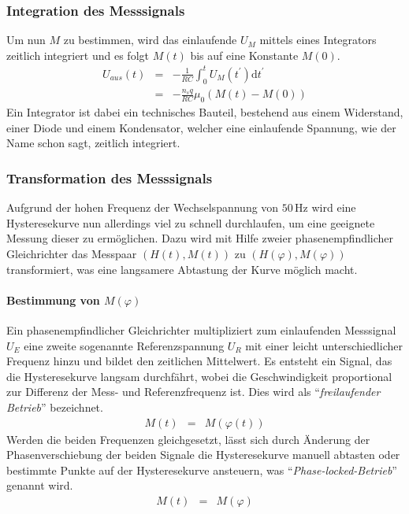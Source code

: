 \documentclass[12pt,a4paper]{scrartcl}
\numberwithin{equation}{section} %
\renewcommand{\[}{} %
\renewcommand{\]}{\noindent} %
\begin{document}
\hypertarget{integration-des-messsignals}{%
\subsubsection{Integration des
Messsignals}\label{integration-des-messsignals}}

Um nun \(M\) zu bestimmen, wird das einlaufende \(U_M\) mittels eines
Integrators zeitlich integriert und es folgt \(M(t)\) bis auf eine
Konstante \(M(0)\). \[
\begin{eqnarray}
    U_{aus}(t)
        &=& -\frac{1}{R C} \int_{0}^{t} U_M(t^{\prime}) \mathrm dt^{\prime} \\
        &=& -\frac{n_s q}{R C} \mu_0 (M(t) - M(0))
\end{eqnarray}
\] Ein Integrator ist dabei ein technisches Bauteil, bestehend aus einem
Widerstand, einer Diode und einem Kondensator, welcher eine einlaufende
Spannung, wie der Name schon sagt, zeitlich integriert.

\hypertarget{transformation-des-messsignals}{%
\subsubsection{Transformation des
Messsignals}\label{transformation-des-messsignals}}

Aufgrund der hohen Frequenz der Wechselspannung von \(50\,\mathrm{Hz}\)
wird eine Hysteresekurve nun allerdings viel zu schnell durchlaufen, um
eine geeignete Messung dieser zu ermöglichen. Dazu wird mit Hilfe zweier
phasenempfindlicher Gleichrichter das Messpaar \((H(t), M(t))\) zu
\((H(\varphi), M(\varphi))\) transformiert, was eine langsamere
Abtastung der Kurve möglich macht.

\hypertarget{bestimmung-von-mvarphi}{%
\paragraph{\texorpdfstring{Bestimmung von
\(M(\varphi)\)}{Bestimmung von M(\textbackslash varphi)}}\label{bestimmung-von-mvarphi}}

Ein phasenempfindlicher Gleichrichter multipliziert zum einlaufenden
Messsignal \(U_E\) eine zweite sogenannte Referenzspannung \(U_R\) mit
einer leicht unterschiedlicher Frequenz hinzu und bildet den zeitlichen
Mittelwert. Es entsteht ein Signal, das die Hysteresekurve langsam
durchfährt, wobei die Geschwindigkeit proportional zur Differenz der
Mess- und Referenzfrequenz ist. Dies wird als ``\emph{freilaufender
Betrieb}'' bezeichnet. \[
\begin{eqnarray}
    M(t) &=& M(\varphi(t))
\end{eqnarray}
\] Werden die beiden Frequenzen gleichgesetzt, lässt sich durch Änderung
der Phasenverschiebung der beiden Signale die Hysteresekurve manuell
abtasten oder bestimmte Punkte auf der Hysteresekurve ansteuern, was
``\emph{Phase-locked-Betrieb}'' genannt wird. \[
\begin{eqnarray}
    M(t) &=& M(\varphi)
\end{eqnarray}
\]
\end{document}

